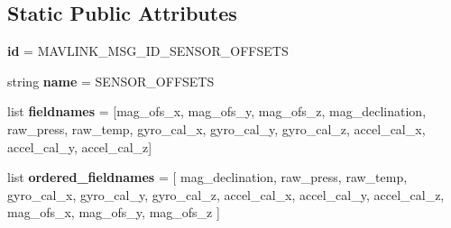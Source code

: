 \subsection*{Static Public Attributes}
\begin{DoxyCompactItemize}
\item 
\mbox{\label{classpymavlink_1_1dialects_1_1v10_1_1MAVLink__sensor__offsets__message_a1a860d34f8064ece0fffdc2b55132ce2}} 
{\bfseries id} = M\+A\+V\+L\+I\+N\+K\+\_\+\+M\+S\+G\+\_\+\+I\+D\+\_\+\+S\+E\+N\+S\+O\+R\+\_\+\+O\+F\+F\+S\+E\+TS
\item 
\mbox{\label{classpymavlink_1_1dialects_1_1v10_1_1MAVLink__sensor__offsets__message_ad59b202cb05d99118da72f94935ec7dc}} 
string {\bfseries name} = \textquotesingle{}S\+E\+N\+S\+O\+R\+\_\+\+O\+F\+F\+S\+E\+TS\textquotesingle{}
\item 
\mbox{\label{classpymavlink_1_1dialects_1_1v10_1_1MAVLink__sensor__offsets__message_a1deb57ee24771af78e70d77e9bf87e34}} 
list {\bfseries fieldnames} = \mbox{[}\textquotesingle{}mag\+\_\+ofs\+\_\+x\textquotesingle{}, \textquotesingle{}mag\+\_\+ofs\+\_\+y\textquotesingle{}, \textquotesingle{}mag\+\_\+ofs\+\_\+z\textquotesingle{}, \textquotesingle{}mag\+\_\+declination\textquotesingle{}, \textquotesingle{}raw\+\_\+press\textquotesingle{}, \textquotesingle{}raw\+\_\+temp\textquotesingle{}, \textquotesingle{}gyro\+\_\+cal\+\_\+x\textquotesingle{}, \textquotesingle{}gyro\+\_\+cal\+\_\+y\textquotesingle{}, \textquotesingle{}gyro\+\_\+cal\+\_\+z\textquotesingle{}, \textquotesingle{}accel\+\_\+cal\+\_\+x\textquotesingle{}, \textquotesingle{}accel\+\_\+cal\+\_\+y\textquotesingle{}, \textquotesingle{}accel\+\_\+cal\+\_\+z\textquotesingle{}\mbox{]}
\item 
\mbox{\label{classpymavlink_1_1dialects_1_1v10_1_1MAVLink__sensor__offsets__message_a460d3c09e77343493caa452da5efca19}} 
list {\bfseries ordered\+\_\+fieldnames} = \mbox{[} \textquotesingle{}mag\+\_\+declination\textquotesingle{}, \textquotesingle{}raw\+\_\+press\textquotesingle{}, \textquotesingle{}raw\+\_\+temp\textquotesingle{}, \textquotesingle{}gyro\+\_\+cal\+\_\+x\textquotesingle{}, \textquotesingle{}gyro\+\_\+cal\+\_\+y\textquotesingle{}, \textquotesingle{}gyro\+\_\+cal\+\_\+z\textquotesingle{}, \textquotesingle{}accel\+\_\+cal\+\_\+x\textquotesingle{}, \textquotesingle{}accel\+\_\+cal\+\_\+y\textquotesingle{}, \textquotesingle{}accel\+\_\+cal\+\_\+z\textquotesingle{}, \textquotesingle{}mag\+\_\+ofs\+\_\+x\textquotesingle{}, \textquotesingle{}mag\+\_\+ofs\+\_\+y\textquotesingle{}, \textquotesingle{}mag\+\_\+ofs\+\_\+z\textquotesingle{} \mbox{]}

\end{DoxyCompactItemize}
